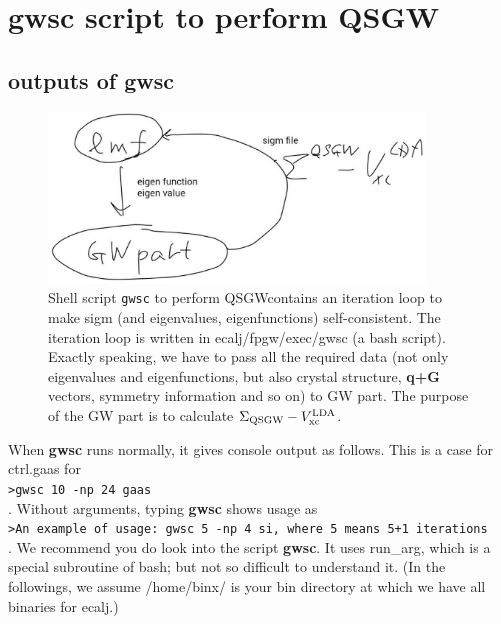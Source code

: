 \documentclass[a4paper,10pt,epsf,fleqn]{article}
\def\QSGW{QS{GW}}
\newcommand{\exe}[1]{{\bf #1}}
\newcommand{\io}[1]{{\sf  #1}}
\begin{document}



\newpage
\section{gwsc script to perform QSGW}
\label{gwsc}

\subsection{outputs of \exe{gwsc}}

\begin{figure}[h]
\includegraphics[width=10cm]{gwsc2014-12-091.eps}
\caption[]{Shell script {\tt gwsc} to perform \QSGW contains 
an iteration loop to make sigm (and eigenvalues, eigenfunctions)
self-consistent. The iteration loop is written in 
ecalj/fpgw/exec/gwsc (a bash script). 
Exactly speaking, we have to pass all the required data 
(not only eigenvalues and eigenfunctions, but also 
crystal structure, {\bf q+G} vectors, symmetry information and so on) to GW part.
The purpose of the GW part is to calculate $\Sigma_{\rm QSGW}-V_{\rm xc}^{\rm LDA}$.}
\label{gwscpicture}
\end{figure}

When \exe{gwsc} runs normally, it gives console output as follows.
This is a case for \io{ctrl.gaas} for\\
\verb#>gwsc 10 -np 24 gaas#\\
. Without arguments, typing \exe{gwsc} shows usage as \\
\verb#>An example of usage: gwsc 5 -np 4 si, where 5 means 5+1 iterations#\\
. We recommend you do look into the script \exe{gwsc}. 
It uses \io{run\_arg}, which is a special
subroutine of bash; but not so difficult to understand it.
(In the followings, we assume \io{/home/binx/} is your bin directory 
at which we have all binaries for ecalj.)
\end{document}
